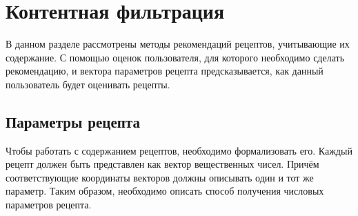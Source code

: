 \section{Контентная фильтрация}

В данном разделе рассмотрены методы рекомендаций рецептов, учитывающие их содержание.
С помощью оценок пользователя, для которого необходимо сделать рекомендацию, и вектора параметров рецепта предсказывается, как данный пользователь будет оценивать рецепты.

\subsection{Параметры рецепта}
Чтобы работать с содержанием рецептов, необходимо формализовать его.
Каждый рецепт должен быть представлен как вектор вещественных чисел.
Причём соответствующие координаты векторов должны описывать один и тот же параметр.
Таким образом, необходимо описать способ получения числовых параметров рецепта.

